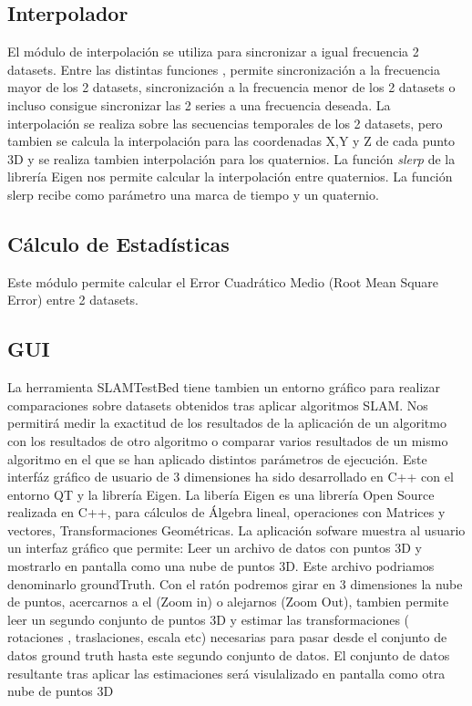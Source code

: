 \subsection{Interpolador}

	El módulo de interpolación se utiliza para sincronizar a igual frecuencia 2 datasets.
	Entre las distintas funciones , permite sincronización a la frecuencia mayor de los 2 datasets, sincronización a la frecuencia menor de los 2 datasets o incluso consigue sincronizar las 2 series a una frecuencia deseada. La interpolación se realiza sobre las secuencias temporales de los 2 datasets, pero tambien se calcula la interpolación para las coordenadas X,Y y Z de cada punto 3D y se realiza tambien interpolación para los quaternios. La función \textit{slerp} de la librería Eigen nos permite calcular la interpolación entre quaternios. La función slerp recibe como parámetro una marca de tiempo y un quaternio.

\subsection{Cálculo de Estadísticas}

Este módulo permite calcular el Error Cuadrático Medio (Root Mean Square Error) entre 2 datasets.


\subsection{GUI}

La herramienta SLAMTestBed tiene tambien un entorno gráfico para realizar comparaciones sobre datasets obtenidos tras aplicar algoritmos SLAM. 
Nos permitirá medir la exactitud de los resultados de la aplicación de un algoritmo con los resultados de otro algoritmo o comparar varios resultados de un mismo algoritmo en el que se han aplicado distintos parámetros de ejecución.
Este interfáz gráfico de usuario de 3 dimensiones ha sido desarrollado en C++ con el entorno QT y la librería Eigen. La libería Eigen es una librería Open Source realizada en C++, para cálculos de Álgebra lineal, operaciones con Matrices y vectores, Transformaciones Geométricas. 
La aplicación sofware muestra al usuario un interfaz gráfico que permite:
Leer un archivo de datos con puntos 3D y mostrarlo en pantalla como una nube de puntos 3D. Este archivo podriamos denominarlo groundTruth.
Con el ratón podremos girar en 3 dimensiones la nube de puntos, acercarnos a el (Zoom in) o alejarnos (Zoom Out),
tambien permite leer un segundo conjunto de puntos 3D y estimar las transformaciones ( rotaciones , traslaciones, escala etc)  necesarias para pasar desde el conjunto de datos ground truth hasta este segundo conjunto de datos. El conjunto de datos resultante tras aplicar las estimaciones será visulalizado en pantalla como otra nube de puntos 3D

